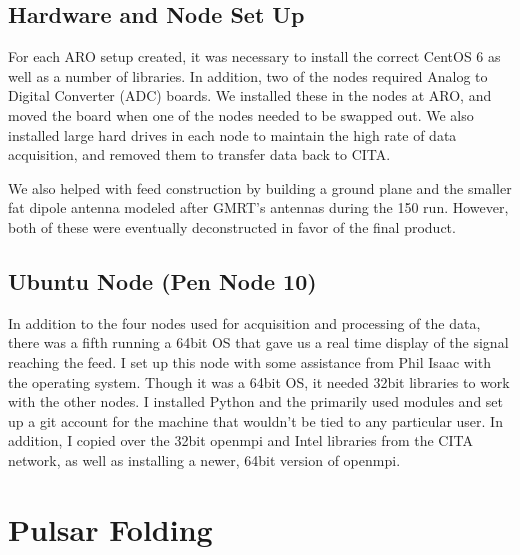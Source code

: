 \documentclass[a4paper,12pt]{article}
\begin{document}
\subsection{Hardware and Node Set Up}
\label{sec:hardware}

For each ARO setup created, it was necessary to install the correct CentOS 6 as well as a number of libraries. In addition, two of the nodes required Analog to Digital Converter (ADC) boards. We installed these in the nodes at ARO, and moved the board when one of the nodes needed to be swapped out. We also installed large hard drives in each node to maintain the high rate of data acquisition, and removed them to transfer data back to CITA.

We also helped with feed construction by building a ground plane and the smaller fat dipole antenna modeled after GMRT’s antennas during the \unit{150}{\mega\hertz} run. However, both of these were eventually deconstructed in favor of the final product.

\subsection{Ubuntu Node (Pen Node 10)}
\label{sec:ubuntunode}

In addition to the four nodes used for acquisition and processing of the data, there was a fifth running a 64bit OS that gave us a real time display of the signal reaching the feed. I set up this node with some assistance from Phil Isaac with the operating system. Though it was a 64bit OS, it needed 32bit libraries to work with the other nodes.  I installed Python and the primarily used modules and set up a git account for the machine that wouldn’t be tied to any particular user. In addition, I copied over the 32bit openmpi and Intel libraries from the CITA network, as well as installing a newer, 64bit version of openmpi.

\section{Pulsar Folding}
\label{sec:pulsarfolding}
\end{document}

